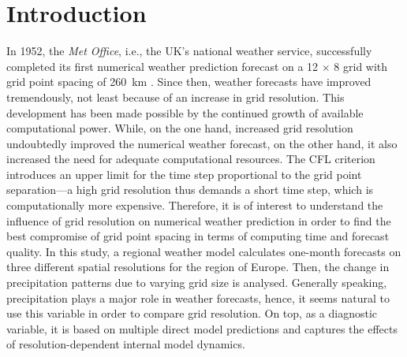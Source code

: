 \section{Introduction}

In 1952, the \textit{Met Office}, i.e., the UK's national weather service, successfully completed its first numerical weather prediction forecast on a 12 \(\times\) 8 grid with grid point spacing of \SI{260}{\km} \parencite{MetOffice}. Since then, weather forecasts have improved tremendously, not least because of an increase in grid resolution. This development has been made possible by the continued growth of available computational power. While, on the one hand, increased grid resolution undoubtedly improved the numerical weather forecast, on the other hand, it also increased the need for adequate computational resources. The CFL criterion introduces an upper limit for the time step proportional to the grid point separation---a high grid resolution thus demands a short time step, which is computationally more expensive. Therefore, it is of interest to understand the influence of grid resolution on numerical weather prediction in order to find the best compromise of grid point spacing in terms of computing time and forecast quality. 
In this study, a regional weather model calculates one-month forecasts on three different spatial resolutions for the region of Europe. Then, the change in precipitation patterns due to varying grid size is analysed. Generally speaking, precipitation plays a major role in weather forecasts, hence, it seems natural to use this variable in order to compare grid resolution. On top, as a diagnostic variable, it is based on multiple direct model predictions and captures the effects of resolution-dependent internal model dynamics.